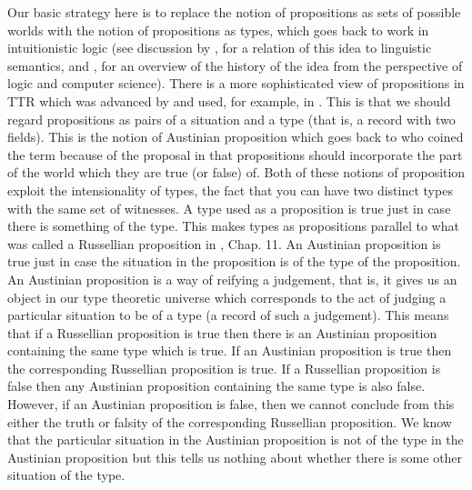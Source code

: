 Our basic strategy here is to replace the notion of propositions as
sets of possible worlds with the notion of propositions as types,
which goes back to work in intuitionistic logic (see discussion by
\citealp{Ranta1994}, for a relation of this idea to linguistic
semantics, and \citealp{Wadler2015}, for an overview of the history of
the idea from the perspective of logic and computer science).
There is a more sophisticated view of propositions in TTR which was
advanced by \cite{Ginzburg2012} and used, for example, in
\cite{CooperDobnikLappinLarsson2015}.  This is that we should
regard propositions as pairs of a situation and a type (that is, a
record with two fields).  This is the notion of Austinian proposition
which goes back to \cite{BarwisePerry1983} who coined the term because
of the proposal in \cite{Austin1961} that propositions should
incorporate the part of the world which they are true (or false) of.
Both of these notions of proposition exploit the intensionality of
types, the fact that you can have two distinct types with the same set
of witnesses.  A type used as a proposition is true just in case there
is something of the type.  This makes types as propositions parallel
to what was called a Russellian proposition in
\cite{Barwise1989}, Chap. 11.  An Austinian proposition is true just in
case the situation in the proposition is of the type of the
proposition.  An Austinian proposition is a way of reifying a
judgement, that is, it gives us an object in our type theoretic
universe which corresponds to the act of judging a particular
situation to be of a type (a record of such a judgement). This means
that if a Russellian proposition is true then there is an Austinian
proposition containing the same type which is true.  If an Austinian
proposition is true then the corresponding Russellian proposition is
true.  If a Russellian proposition is false then any Austinian
proposition containing the same type is also false.  However, if an
Austinian proposition is false, then we cannot conclude from this
either the truth or falsity of the corresponding Russellian
proposition.  We know that the particular situation in the Austinian
proposition is not of the type in the Austinian proposition but this
tells us nothing about whether there is some other situation of the
type.

